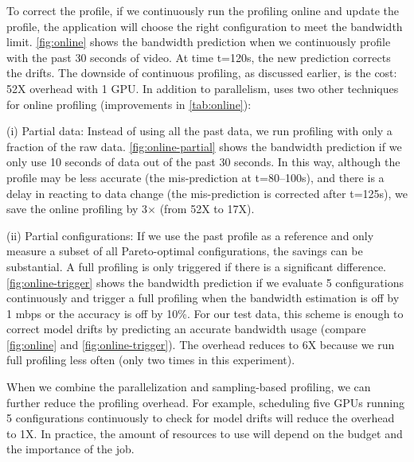To correct the profile, if we continuously run the profiling online and update
the profile, the application will choose the right configuration to meet the bandwidth limit.
\autoref{fig:online} shows the bandwidth prediction when we continuously
profile with the past 30 seconds of video. At time t=120s, the new
prediction corrects the drifts. The downside of continuous profiling, as
discussed earlier, is the cost: 52X overhead with 1 GPU\@. In addition to
parallelism, \sysname{} uses two other techniques for online profiling
(improvements in \autoref{tab:online}):

(i) Partial data: Instead of using all the past data, we run profiling with only
a fraction of the raw data.
\autoref{fig:online-partial} shows the bandwidth prediction if we only use 10
seconds of data out of the past 30 seconds. In this way, although the profile
may be less accurate (the mis-prediction at t=80--100s), and there is a
delay in reacting to data change (the mis-prediction is corrected after t=125s), we save the online profiling by 3$\times$ (from 52X to 17X).

(ii) Partial configurations: If we use the past profile as a reference and only
measure a subset of all Pareto-optimal configurations, the savings can be
substantial. A full profiling is only triggered if there is a significant
difference. \autoref{fig:online-trigger} shows the bandwidth prediction if we
evaluate 5 configurations continuously and trigger a full profiling when the
bandwidth estimation is off by 1 mbps or the accuracy is off by 10\%.
For our test data, this scheme is enough to correct model drifts by predicting an accurate bandwidth usage
(compare \autoref{fig:online} and \autoref{fig:online-trigger}).
The overhead reduces to 6X because we run full profiling less often (only two times in this experiment).

When we combine the parallelization and sampling-based profiling, we can further
reduce the profiling overhead. For example, scheduling five GPUs running 5
configurations continuously to check for model drifts will reduce the overhead
to 1X\@. In practice, the amount of resources to use will depend on the budget and the importance
of the job.


